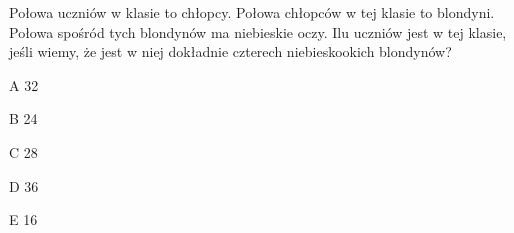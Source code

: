 \begin{tresc}
Połowa uczniów w klasie to chłopcy. Połowa chłopców w tej klasie to blondyni. Połowa spośród tych blondynów ma niebieskie oczy. Ilu uczniów jest w tej klasie, jeśli wiemy, że jest w niej dokładnie czterech niebieskookich blondynów?
\end{tresc}
\begin{wariant}{A} 32 \end{wariant}
\begin{wariant}{B} 24 \end{wariant}
\begin{wariant}{C} 28 \end{wariant}
\begin{wariant}{D} 36 \end{wariant}
\begin{wariant}{E} 16 \end{wariant}
